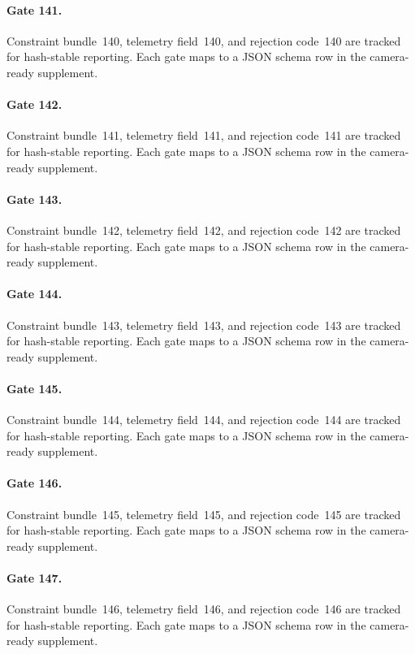 \documentclass[sigconf,nonacm]{acmart}
\begin{document}
\paragraph{Gate 141.}
Constraint bundle~140, telemetry field~140, and rejection code~140 are tracked for hash-stable reporting. Each gate maps to a JSON schema row in the camera-ready supplement. %

\paragraph{Gate 142.}
Constraint bundle~141, telemetry field~141, and rejection code~141 are tracked for hash-stable reporting. Each gate maps to a JSON schema row in the camera-ready supplement. %

\paragraph{Gate 143.}
Constraint bundle~142, telemetry field~142, and rejection code~142 are tracked for hash-stable reporting. Each gate maps to a JSON schema row in the camera-ready supplement. %

\paragraph{Gate 144.}
Constraint bundle~143, telemetry field~143, and rejection code~143 are tracked for hash-stable reporting. Each gate maps to a JSON schema row in the camera-ready supplement. %

\paragraph{Gate 145.}
Constraint bundle~144, telemetry field~144, and rejection code~144 are tracked for hash-stable reporting. Each gate maps to a JSON schema row in the camera-ready supplement. %

\paragraph{Gate 146.}
Constraint bundle~145, telemetry field~145, and rejection code~145 are tracked for hash-stable reporting. Each gate maps to a JSON schema row in the camera-ready supplement. %

\paragraph{Gate 147.}
Constraint bundle~146, telemetry field~146, and rejection code~146 are tracked for hash-stable reporting. Each gate maps to a JSON schema row in the camera-ready supplement. %
\end{document}
